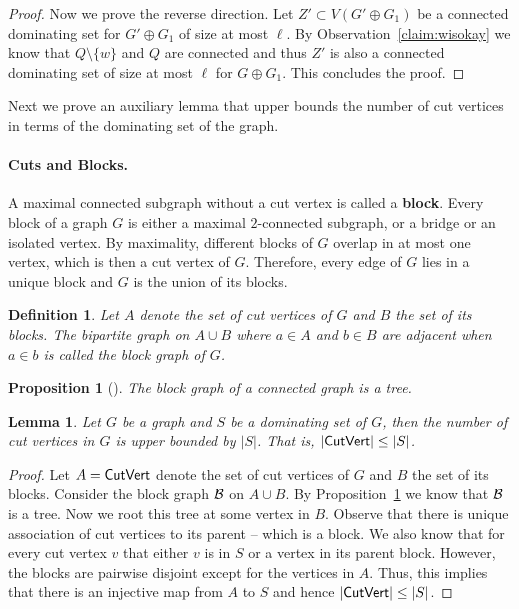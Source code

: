 \documentclass[11pt]{article}
\newtheorem{proposition}{Proposition}
\newtheorem{lemma}{Lemma}
\newtheorem{definition}{Definition}
\begin{document}
\begin{proof}
Now we prove the reverse direction. Let  $Z' \subset V(G' \oplus G_1)$  be a connected dominating set for $G'\oplus G_1$ of size at most $\ell$.  By Observation~\ref{claim:wisokay} we know that $Q\setminus \{w\}$ and $Q$ are connected and thus $Z'$ is also a connected dominating set of size at most $\ell$ for $G\oplus G_1$. This concludes the proof.  
\end{proof}











 Next we prove an auxiliary lemma that upper bounds the number of cut vertices in terms of the dominating set of the graph. 
 
 \paragraph{Cuts and Blocks.} 
 A maximal connected subgraph without a cut vertex is called a \textbf{block}. Every block of a graph $G$ is either a maximal $2$-connected subgraph, or a bridge or an isolated vertex. By maximality, different blocks of $G$ overlap in at most one vertex, which is then a cut vertex of $G$. Therefore, every edge of $G$ lies in a unique block and $G$ is the union of its blocks.

\begin{definition} Let $A$ denote the set of cut vertices of $G$ and $B$ the set of its blocks. The bipartite graph on $A\cup B$ where $a\in A$ and $b\in B$ are adjacent when $a\in b$ is called the block graph of $G$.
\end{definition}

\begin{proposition}[\cite{diestelbook}] 
\label{prop:blockgraphtree}
The block graph of a connected graph is a tree.
\end{proposition}

 \begin{lemma}
 \label{lem:cutvertexcount}
 Let $G$ be a graph and $S$ be a dominating set of $G$, then the number of cut vertices in $G$ is upper bounded by $|S|$. That is, $|{\sf CutVert}|\leq |S|$. 
 \end{lemma} 
\begin{proof}
Let $A={\sf CutVert}$ denote the set of cut vertices of $G$ and $B$ the set of its blocks. Consider the block graph $\cal B$ on $A\cup B$. By Proposition~\ref{prop:blockgraphtree} we know that $\cal B$ is a tree. Now we root this tree at some vertex in $B$. Observe that there is unique association of cut vertices to its parent -- which is a block.  
We also know that for every  cut vertex $v$ that either $v$ is in $S$ or a vertex in its parent  block. However, the blocks are pairwise disjoint except for the vertices in $A$. Thus, this implies that there is an injective map from $A$ to $S$ and hence $|{\sf CutVert}|\leq |S|$. 
\end{proof}
\end{document}
